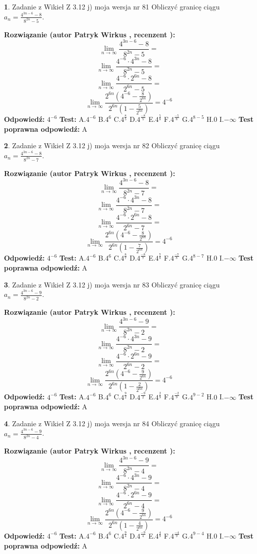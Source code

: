 \documentclass[12pt, a4paper]{article}
\theoremstyle{definition} %
\newtheorem{zad}{}
\newcommand{\zadStart}[1]{\begin{zad}#1\newline}
\newcommand{\zadStop}{\end{zad}}
\newcommand{\rozwStart}[2]{\noindent \textbf{Rozwiązanie (autor #1 , recenzent #2): }\newline}
\newcommand{\rozwStop}{\newline}
\newcommand{\odpStart}{\noindent \textbf{Odpowiedź:}\newline}
\newcommand{\odpStop}{\newline}
\newcommand{\testStart}{\noindent \textbf{Test:}\newline}
\newcommand{\testStop}{\newline}
\newcommand{\kluczStart}{\noindent \textbf{Test poprawna odpowiedź:}\newline}
\newcommand{\kluczStop}{\newline}
\begin{document}
\zadStart{Zadanie z Wikieł Z 3.12 j) moja wersja nr 81}
Obliczyć granicę ciągu $a_{n}=\frac{4^{3n-6}-8}{8^{2n}-5}$.
\zadStop
\rozwStart{Patryk Wirkus}{}
$$\lim\limits_{n\to\infty}\frac{4^{3n-6}-8}{8^{2n}-5}=$$
$$\lim\limits_{n\to\infty}\frac{4^{-6} \cdot 4^{3n}-8}{8^{2n}-5}=$$
$$\lim\limits_{n\to\infty}\frac{4^{-6} \cdot 2^{6n}-8}{2^{6n}-5}=$$
$$\lim\limits_{n\to\infty}\frac{2^{6n}(4^{-6} - \frac{8}{2^{6n}})}{2^{6n}(1-\frac{5}{2^{6n}})}= 4^{-6}$$
\rozwStop
\odpStart
$4^{-6}$
\odpStop
\testStart
A.$4^{-6}$
B.$4^{6}$
C.$4^{\frac{8}{5}}$
D.$4^{\frac{-8}{5}}$
E.$4^{\frac{5}{8}}$
F.$4^{\frac{-5}{8}}$
G.$4^{8-5}$
H.$0$
I.$-\infty$
\testStop
\kluczStart
A
\kluczStop



\zadStart{Zadanie z Wikieł Z 3.12 j) moja wersja nr 82}
Obliczyć granicę ciągu $a_{n}=\frac{4^{3n-6}-8}{8^{2n}-7}$.
\zadStop
\rozwStart{Patryk Wirkus}{}
$$\lim\limits_{n\to\infty}\frac{4^{3n-6}-8}{8^{2n}-7}=$$
$$\lim\limits_{n\to\infty}\frac{4^{-6} \cdot 4^{3n}-8}{8^{2n}-7}=$$
$$\lim\limits_{n\to\infty}\frac{4^{-6} \cdot 2^{6n}-8}{2^{6n}-7}=$$
$$\lim\limits_{n\to\infty}\frac{2^{6n}(4^{-6} - \frac{8}{2^{6n}})}{2^{6n}(1-\frac{7}{2^{6n}})}= 4^{-6}$$
\rozwStop
\odpStart
$4^{-6}$
\odpStop
\testStart
A.$4^{-6}$
B.$4^{6}$
C.$4^{\frac{8}{7}}$
D.$4^{\frac{-8}{7}}$
E.$4^{\frac{7}{8}}$
F.$4^{\frac{-7}{8}}$
G.$4^{8-7}$
H.$0$
I.$-\infty$
\testStop
\kluczStart
A
\kluczStop



\zadStart{Zadanie z Wikieł Z 3.12 j) moja wersja nr 83}
Obliczyć granicę ciągu $a_{n}=\frac{4^{3n-6}-9}{8^{2n}-2}$.
\zadStop
\rozwStart{Patryk Wirkus}{}
$$\lim\limits_{n\to\infty}\frac{4^{3n-6}-9}{8^{2n}-2}=$$
$$\lim\limits_{n\to\infty}\frac{4^{-6} \cdot 4^{3n}-9}{8^{2n}-2}=$$
$$\lim\limits_{n\to\infty}\frac{4^{-6} \cdot 2^{6n}-9}{2^{6n}-2}=$$
$$\lim\limits_{n\to\infty}\frac{2^{6n}(4^{-6} - \frac{9}{2^{6n}})}{2^{6n}(1-\frac{2}{2^{6n}})}= 4^{-6}$$
\rozwStop
\odpStart
$4^{-6}$
\odpStop
\testStart
A.$4^{-6}$
B.$4^{6}$
C.$4^{\frac{9}{2}}$
D.$4^{\frac{-9}{2}}$
E.$4^{\frac{2}{9}}$
F.$4^{\frac{-2}{9}}$
G.$4^{9-2}$
H.$0$
I.$-\infty$
\testStop
\kluczStart
A
\kluczStop



\zadStart{Zadanie z Wikieł Z 3.12 j) moja wersja nr 84}
Obliczyć granicę ciągu $a_{n}=\frac{4^{3n-6}-9}{8^{2n}-4}$.
\zadStop
\rozwStart{Patryk Wirkus}{}
$$\lim\limits_{n\to\infty}\frac{4^{3n-6}-9}{8^{2n}-4}=$$
$$\lim\limits_{n\to\infty}\frac{4^{-6} \cdot 4^{3n}-9}{8^{2n}-4}=$$
$$\lim\limits_{n\to\infty}\frac{4^{-6} \cdot 2^{6n}-9}{2^{6n}-4}=$$
$$\lim\limits_{n\to\infty}\frac{2^{6n}(4^{-6} - \frac{9}{2^{6n}})}{2^{6n}(1-\frac{4}{2^{6n}})}= 4^{-6}$$
\rozwStop
\odpStart
$4^{-6}$
\odpStop
\testStart
A.$4^{-6}$
B.$4^{6}$
C.$4^{\frac{9}{4}}$
D.$4^{\frac{-9}{4}}$
E.$4^{\frac{4}{9}}$
F.$4^{\frac{-4}{9}}$
G.$4^{9-4}$
H.$0$
I.$-\infty$
\testStop
\kluczStart
A
\kluczStop
\end{document}
